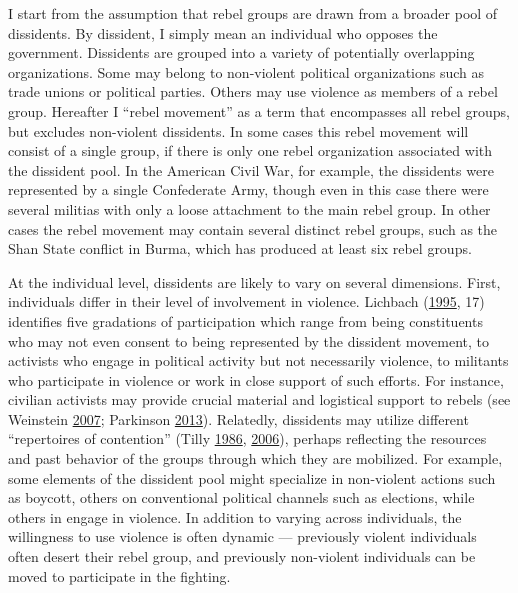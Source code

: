 \documentclass[12pt,]{book}
\theoremstyle{definition}
\theoremstyle{definition}
\theoremstyle{definition}
\theoremstyle{remark}
\begin{document}
I start from the assumption that rebel groups are drawn from a broader
pool of dissidents. By dissident, I simply mean an individual who
opposes the government. Dissidents are grouped into a variety of
potentially overlapping organizations. Some may belong to non-violent
political organizations such as trade unions or political parties.
Others may use violence as members of a rebel group. Hereafter I ``rebel
movement'' as a term that encompasses all rebel groups, but excludes
non-violent dissidents. In some cases this rebel movement will consist
of a single group, if there is only one rebel organization associated
with the dissident pool. In the American Civil War, for example, the
dissidents were represented by a single Confederate Army, though even in
this case there were several militias with only a loose attachment to
the main rebel group. In other cases the rebel movement may contain
several distinct rebel groups, such as the Shan State conflict in Burma,
which has produced at least six rebel groups.

At the individual level, dissidents are likely to vary on several
dimensions. First, individuals differ in their level of involvement in
violence. Lichbach (\protect\hyperlink{ref-Lichbach1995}{1995}, 17)
identifies five gradations of participation which range from being
constituents who may not even consent to being represented by the
dissident movement, to activists who engage in political activity but
not necessarily violence, to militants who participate in violence or
work in close support of such efforts. For instance, civilian activists
may provide crucial material and logistical support to rebels (see
Weinstein \protect\hyperlink{ref-Weinstein2007}{2007}; Parkinson
\protect\hyperlink{ref-Parkinson2013c}{2013}). Relatedly, dissidents may
utilize different ``repertoires of contention'' (Tilly
\protect\hyperlink{ref-Tilly1986}{1986},
\protect\hyperlink{ref-Tilly2006}{2006}), perhaps reflecting the
resources and past behavior of the groups through which they are
mobilized. For example, some elements of the dissident pool might
specialize in non-violent actions such as boycott, others on
conventional political channels such as elections, while others in
engage in violence. In addition to varying across individuals, the
willingness to use violence is often dynamic --- previously violent
individuals often desert their rebel group, and previously non-violent
individuals can be moved to participate in the fighting.
\end{document}
